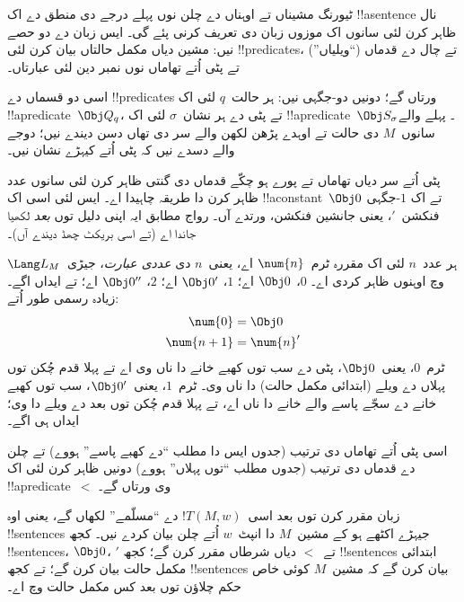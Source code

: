 \documentclass[../../../include/open-logic-section]{subfiles}
\begin{document}

\begin{explain}
ٹیورنگ مشیناں تے اوہناں دے چلن نوں پہلے درجے دی منطق دے
اک !!a{sentence} نال ظاہر کرن لئی سانوں اک موزوں زبان دی
تعریف کرنی پئے گی۔ ایس زبان دے دو حصے نیں: مشین دیاں مکمل
حالتاں بیان کرن لئی !!{predicate}s، تے چال دے قدماں (“ویلیاں”)
تے پٹی اُتے تھاماں نوں نمبر دین لئی عبارتاں۔

اسی دو قسماں دے !!{predicate}s ورتاں گے؛ دونیں دو-جگہی
نیں: ہر حالت~$q$ لئی اک !!a{predicate}~$\Obj Q_q$، تے پٹی دے
ہر نشان~$\sigma$ لئی اک !!a{predicate}~$\Obj S_\sigma$۔ پہلے
والے سانوں~$M$ دی حالت تے اوہدے پڑھن لکھن والے سر دی تھاں
دسن دیندے نیں؛ دوجے والے دسدے نیں کہ پٹی اُتے کیہڑے نشان نیں۔

پٹی اُتے سر دیاں تھاماں تے پورے ہو چکّے قدماں دی گنتی ظاہر
کرن لئی سانوں عدد ظاہر کرن دا طریقہ چاہیدا اے۔ ایس لئی
اسی اک !!a{constant}~$\Obj 0$ تے اک $1$-جگہی فنکشن~$\prime$،
یعنی جانشین فنکشن، ورتدے آں۔ رواج مطابق ایہ اپنی دلیل
توں \emph{بعد} لکھیا جاندا اے (تے اسی بریکٹ چھڈ دیندے آں)۔

ہر عدد~$n$ لئی اک مقررہ ٹرم~$\num{n}$ اے، یعنی~$n$ دی
\emph{عددی عبارت}، جیڑی~$\Lang L_M$ وچ اوہنوں ظاہر کردی اے۔
$\num{0}$، $\Obj 0$ اے؛ $\num{1}$، $\Obj 0'$ اے؛
$\num{2}$، $\Obj 0''$ اے؛ تے ایداں اگے۔ زیادہ رسمی طور اُتے:
\begin{align*}
\num{0} & = \Obj 0 \\
\num{n+1} &= \num{n}'
\end{align*}
ٹرم~$\num{0}$، یعنی~$\Obj 0$، پٹی دے سب توں کھبے خانے
دا ناں وی اے تے پہلا قدم چُکن توں پہلاں دے ویلے
(ابتدائی مکمل حالت) دا ناں وی۔ ٹرم~$\num{1}$، یعنی~$\Obj 0'$،
سب توں کھبے خانے دے سجّے پاسے والے خانے دا ناں اے، تے
پہلا قدم چُکن توں بعد دے ویلے دا وی؛ ایداں ہی اگے۔

اسی پٹی اُتے تھاماں دی ترتیب (جدوں ایس دا مطلب “دے کھبے
پاسے” ہووے) تے چلن دے قدماں دی ترتیب (جدوں مطلب “توں پہلاں”
ہووے) دونیں ظاہر کرن لئی اک !!a{predicate}~$<$ وی ورتاں گے۔

زبان مقرر کرن توں بعد اسی~$!T(M,
w)$ دے “مسلّمے” لکھاں گے، یعنی اوہ !!{sentence}s جیہڑے
اکٹھے ہو کے مشین~$M$ دا انپٹ~$w$ اُتے چلن بیان
کردے نیں۔ کجھ !!{sentence}s، $\Obj 0$، $\prime$ تے~$<$
دیاں شرطاں مقرر کرن گے؛ کجھ !!{sentence}s ابتدائی مکمل
حالت بیان کرن گے؛ تے کجھ !!{sentence}s بیان کرن گے کہ
مشین~$M$ کوئی خاص حکم چلاؤن توں بعد کس مکمل حالت وچ اے۔
\end{explain}
\end{document}
